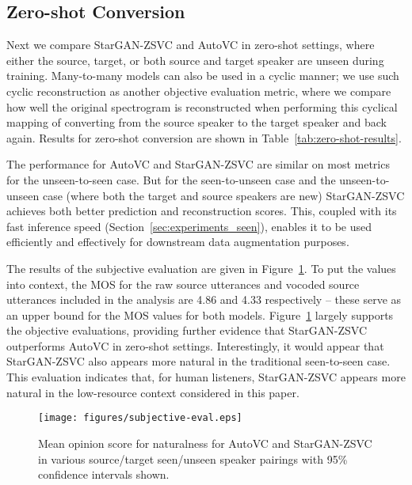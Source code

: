 \subsection{Zero-shot Conversion}
Next we compare StarGAN-ZSVC and AutoVC in zero-shot settings, where either the source, target, or both source and target speaker are unseen during training. 
Many-to-many models can also be used in a cyclic manner; 
we use such cyclic reconstruction as another objective evaluation metric, where we compare how well the original spectrogram is reconstructed when performing this cyclical mapping of converting from the source speaker to the target speaker and back again.
Results for zero-shot conversion are shown in Table~\ref{tab:zero-shot-results}.

The performance for AutoVC and StarGAN-ZSVC are similar on most metrics for the unseen-to-seen case.
But for the seen-to-unseen case and the unseen-to-unseen case (where both the target and source speakers are new) StarGAN-ZSVC achieves both better prediction and reconstruction scores.
This, coupled with its fast inference speed (Section~\ref{sec:experiments_seen}), enables it to be used efficiently and effectively for downstream data augmentation purposes.

The results of the subjective evaluation are given in Figure~\ref{fig:subjective-eval}.
To put the values into context, the MOS for the raw source utterances and vocoded source
utterances included in the analysis are 4.86 and 4.33 respectively -- these serve as an upper bound for the MOS values for both models.
Figure~\ref{fig:subjective-eval} largely supports the objective evaluations, providing further evidence that StarGAN-ZSVC outperforms AutoVC in zero-shot settings.
Interestingly, it would appear that StarGAN-ZSVC also appears more natural in the traditional seen-to-seen case.
This evaluation indicates that, for human listeners, StarGAN-ZSVC appears more natural in the low-resource context considered in this paper.


\begin{figure}[!t]
\texttt{[image: figures/subjective-eval.eps]}
\caption{Mean opinion score for naturalness for AutoVC and StarGAN-ZSVC in various source/target seen/unseen speaker pairings with 95\% confidence intervals shown.} \label{fig:subjective-eval}
\end{figure}

